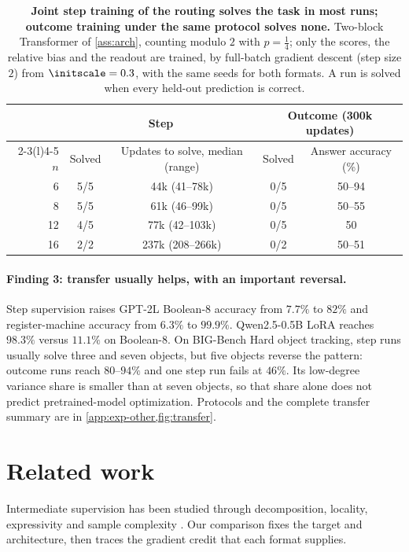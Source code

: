 \begin{table}[t]
\caption{\textbf{Joint step training of the routing solves the task in most runs; outcome training under the same protocol solves
none.} Two-block Transformer of \cref{ass:arch}, counting modulo $2$ with $p=\tfrac{1}{4}$; only the scores, the relative bias and the
readout are trained, by full-batch gradient descent (step size $2$) from $\initscale=0.3$, with the same seeds for both formats. A run is
solved when every held-out prediction is correct.}
\label{tab:reach}
\centering\small
\begin{tabular}{@{}rcccc@{}}
\toprule
 & \multicolumn{2}{c}{Step} & \multicolumn{2}{c}{Outcome (300k updates)}\\
\cmidrule(lr){2-3}\cmidrule(l){4-5}
$n$ & Solved & Updates to solve, median (range) & Solved & Answer accuracy (\%)\\
\midrule
6  & 5/5 & 44k (41--78k)   & 0/5 & 50--94\\
8  & 5/5 & 61k (46--99k)   & 0/5 & 50--55\\
12 & 4/5 & 77k (42--103k)  & 0/5 & 50\\
16 & 2/2 & 237k (208--266k) & 0/2 & 50--51\\
\bottomrule
\end{tabular}
\end{table}

\paragraph{Finding 3: transfer usually helps, with an important reversal.}
Step supervision raises GPT-2L Boolean-8 accuracy from $7.7\%$ to $82\%$ and register-machine
accuracy from $6.3\%$ to $99.9\%$. Qwen2.5-0.5B LoRA reaches $98.3\%$ versus $11.1\%$
on Boolean-8. On BIG-Bench Hard object tracking, step runs usually solve three and seven
objects, but five objects reverse the pattern: outcome runs reach $80$--$94\%$ and one
step run fails at $46\%$. Its low-degree variance share is smaller than at seven objects,
so that share alone does not predict pretrained-model optimization. Protocols and the
complete transfer summary are in \cref{app:exp-other,fig:transfer}.

\section{Related work}
\label{sec:related}

Intermediate supervision has been studied through decomposition, locality, expressivity and
sample complexity \citep{nye2021scratchpads,wies2023subtask,prystawski2023think,abbe2024globality,
feng2023towards,merrill2024expressive,malach2023autoregressive,hanneke2026samplecomplexityautoregressivereasoning,wen2024sparse}.
Our comparison fixes the target and architecture, then traces the gradient credit that each format supplies.

